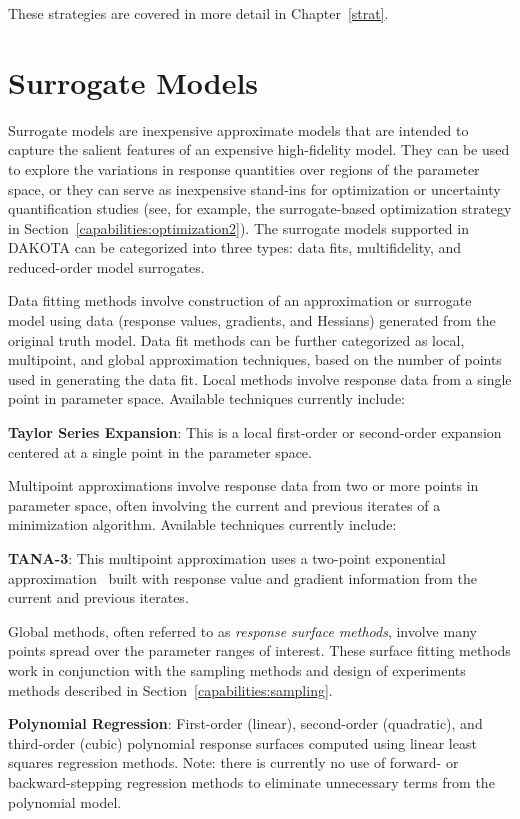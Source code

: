 These strategies are covered in more detail in Chapter~\ref{strat}.

\section{Surrogate Models}\label{capabilities:surrogate}

Surrogate models are inexpensive approximate models that are intended
to capture the salient features of an expensive high-fidelity model.
They can be used to explore the variations in response quantities over
regions of the parameter space, or they can serve as inexpensive
stand-ins for optimization or uncertainty quantification studies (see,
for example, the surrogate-based optimization strategy in
Section~\ref{capabilities:optimization2}).  The surrogate models
supported in DAKOTA can be categorized into three types: data fits,
multifidelity, and reduced-order model surrogates.

Data fitting methods involve construction of an approximation or
surrogate model using data (response values, gradients, and Hessians)
generated from the original truth model.  Data fit methods can be
further categorized as local, multipoint, and global approximation
techniques, based on the number of points used in generating the data
fit.  Local methods involve response data from a single point in
parameter space.  Available techniques currently include:

\textbf{Taylor Series Expansion}: This is a local first-order or
second-order expansion centered at a single point in the parameter space.

Multipoint approximations involve response data from two or more
points in parameter space, often involving the current and previous
iterates of a minimization algorithm.  Available techniques currently
include:

\textbf{TANA-3}: This multipoint approximation uses a two-point
exponential approximation~\cite{Xu98,Fad90} built with response value
and gradient information from the current and previous iterates.

Global methods, often referred to as \emph{response surface methods},
involve many points spread over the parameter ranges of interest.
These surface fitting methods work in conjunction with the sampling
methods and design of experiments methods described in
Section~\ref{capabilities:sampling}.

\textbf{Polynomial Regression}: First-order (linear), second-order
(quadratic), and third-order (cubic) polynomial response surfaces
computed using linear least squares regression methods. Note: there is
currently no use of forward- or backward-stepping regression methods
to eliminate unnecessary terms from the polynomial model.


